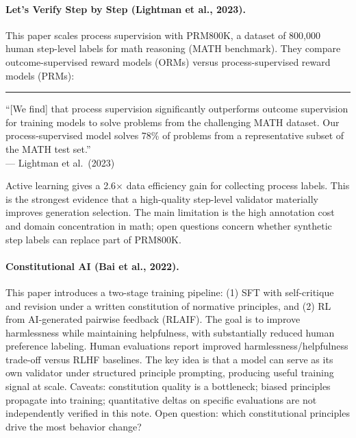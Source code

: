 \documentclass[11pt]{article}
\newenvironment{paperquote}{%
  \vspace{0.5em}%
  \begin{list}{}{%
    \setlength{\leftmargin}{1.5em}%
    \setlength{\rightmargin}{0em}%
    \setlength{\topsep}{0.2em}%
    \setlength{\parsep}{0pt}%
  }%
  \item\relax\small\itshape\leavevmode%
  \hspace{-1.3em}\textcolor{gray!80}{\rule{2pt}{1em}}\hspace{0.5em}%
}{%
  \end{list}%
  \vspace{0.3em}%
}
\begin{document}
\paragraph{Let's Verify Step by Step (Lightman et al., 2023).}
This paper scales process supervision with PRM800K, a dataset of 800,000 human step-level labels for math reasoning (MATH benchmark). They compare outcome-supervised reward models (ORMs) versus process-supervised reward models (PRMs):

\begin{paperquote}
\small ``[We find] that process supervision significantly outperforms outcome supervision for training models to solve problems from the challenging MATH dataset. Our process-supervised model solves 78\% of problems from a representative subset of the MATH test set.''\\
\hfill --- Lightman et al.\ (2023)
\end{paperquote} Active learning gives a 2.6$\times$ data efficiency gain for collecting process labels. This is the strongest evidence that a high-quality step-level validator materially improves generation selection. The main limitation is the high annotation cost and domain concentration in math; open questions concern whether synthetic step labels can replace part of PRM800K.

\paragraph{Constitutional AI (Bai et al., 2022).}
This paper introduces a two-stage training pipeline: (1) SFT with self-critique and revision under a written constitution of normative principles, and (2) RL from AI-generated pairwise feedback (RLAIF). The goal is to improve harmlessness while maintaining helpfulness, with substantially reduced human preference labeling. Human evaluations report improved harmlessness/helpfulness trade-off versus RLHF baselines. The key idea is that a model can serve as its own validator under structured principle prompting, producing useful training signal at scale. Caveats: constitution quality is a bottleneck; biased principles propagate into training; quantitative deltas on specific evaluations are not independently verified in this note. Open question: which constitutional principles drive the most behavior change?
\end{document}

